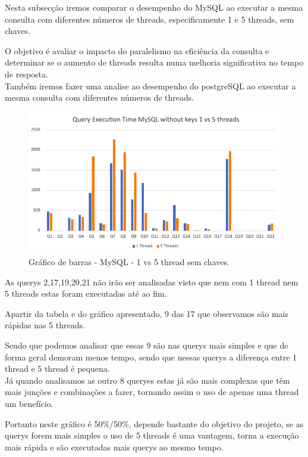 \documentclass{article}
\begin{document}
  \texttt{}\par Nesta subsecção iremos comparar o desempenho do MySQL ao executar a mesma consulta com diferentes números de threads, especificamente 1 e 5 threads, sem chaves. 
  
  O objetivo é avaliar o impacto do paralelismo na eficiência da consulta e determinar se o aumento de threads resulta numa melhoria significativa no tempo de resposta.\\
  
  Também iremos fazer uma analise ao desempenho do postgreSQL ao executar a mesma consulta com diferentes números de threads.

  \begin{figure}[H]
    \centering
    \includegraphics[width=\textwidth]{Graphs/mysql_withoutkeys_1vs5threads.png}
    \caption{Gráfico de barras - MySQL - 1 vs 5 thread sem chaves.} 
    \label{fig:PKCreation2}
  \end{figure}
  
  As querys 2,17,19,20,21 não irão ser analisadas visto que nem com 1 thread nem 5 threads estas foram executadas até ao fim.

  Apartir da tabela e do gráfico apresentado, 9 das 17 que observamos são mais rápidas nas 5 threads.

  Sendo que podemos analisar que essas 9 são nas querys mais simples e que de forma geral demoram menos tempo, sendo que nessas querys a diferença entre 1 thread e 5 thread é pequena. \\

  Já quando analisamos as outro 8 queryes estas já são mais complexas que têm mais junções e combinações a fazer, tornando assim o uso de apenas uma thread um benefício.

  Portanto neste gráfico é 50\%/50\%, depende bastante do objetivo do projeto, se as querys forem mais simples o uso de 5 threads é uma vantagem, torna a execução mais rápida e são executadas mais querys ao mesmo tempo.
\end{document}
